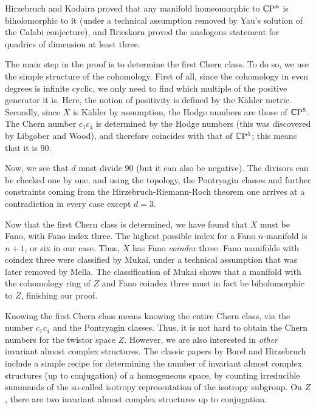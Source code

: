 \documentclass[parskip=half]{scrartcl}
\begin{document}
Hirzebruch and Kodaira proved that any manifold homeomorphic to $\mathbb{C}\mathrm{P}^n$ is biholomorphic to it (under a technical assumption removed by Yau's solution of the Calabi conjecture), and Brieskorn proved the analogous statement for quadrics of dimension at least three.

The main step in the proof is to determine the first Chern class. To do so, we use the simple structure of the cohomology. First of all, since the cohomology in even degrees is infinite cyclic, we only need to find which multiple of the positive generator it is. Here, the notion of positivity is defined by the K\"ahler metric. Secondly, since $X$ is K\"ahler by assumption, the Hodge numbers are those of $\mathbb{C}\mathrm{P}^5$. The Chern number $c_1c_4$ is determined by the Hodge numbers (this was discovered by Libgober and Wood), and therefore coincides with that of $\mathbb{C}\mathrm{P}^5$; this means that it is $90$.

Now, we see that $d$ must divide $90$ (but it can also be negative). The divisors can be checked one by one, and using the topology, the Pontryagin classes and further constraints coming from the Hirzebruch-Riemann-Roch theorem one arrives at a contradiction in every case except $d=3$.

Now that the first Chern class is determined, we have found that $X$ must be Fano, with Fano index three. The highest possible index for a Fano $n$-manifold is $n+1$, or six in our case. Thus, $X$ has Fano \emph{coindex} three. Fano manifolds with coindex three were classified by Mukai, under a technical assumption that was later removed by Mella. The classification of Mukai shows that a manifold with the cohomology ring of $Z$ and Fano coindex three must in fact be biholomorphic to $Z$, finishing our proof.


Knowing the first Chern class means knowing the entire Chern class, via the number $c_1c_4$ and the Pontryagin classes. Thus, it is not hard to obtain the Chern numbers for the twistor space $Z$. However, we are also interested in \emph{other} invariant almost complex structures. The classic papers by Borel and Hirzebruch include a simple recipe for determining the number of invariant almost complex structures (up to conjugation) of a homogeneous space, by counting irreducible summands of the so-called isotropy representation of the isotropy subgroup. On $Z$, there are two invariant almost complex structures up to conjugation. 
\end{document}
